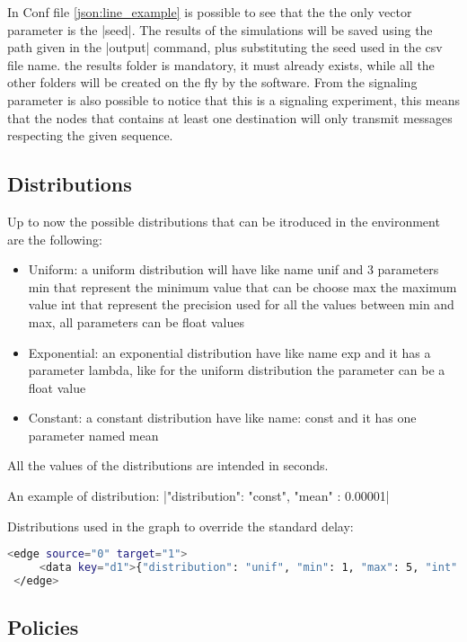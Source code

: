 \documentclass[10pt,journal,onecolumn]{IEEEtran}
\begin{document}
In Conf file \ref{json:line_example} is possible to see that the the only vector
parameter is the |seed|.
The results of the simulations will be saved using the path given in the |output|
command, plus substituting the seed used in the csv file name.
the results folder is mandatory, it must already exists, while all the other 
folders will be created on the fly by the software.
From the signaling parameter is also possible to notice that this is a signaling
experiment, this means that the nodes that contains at least one destination will
only transmit messages respecting the given sequence.

\subsection{Distributions}
\label{subsec:distribution}

Up to now the possible distributions that can be itroduced in the environment are the following:

\begin{itemize}
    \item Uniform: a uniform distribution will have like name unif and 3 parameters 
		min that represent the minimum value that can be choose max the maximum 
		value int that represent the precision used for all the values between 
		min and max, all parameters can be float values
    \item Exponential: an exponential distribution have like name exp and it has 
		a parameter lambda, like for the uniform distribution the parameter can 
		be a float value
    \item Constant: a constant distribution have like name: const and it has one 
		parameter named mean
\end{itemize}

All the values of the distributions are intended in seconds.

An example of distribution: |{"distribution": "const", "mean" : 0.00001}|

Distributions used in the graph to override the standard delay:
\begin{lstlisting}[language=bash]
 <edge source="0" target="1">
     <data key="d1">{"distribution": "unif", "min": 1, "max": 5, "int": 0.01}</data>
 </edge>
\end{lstlisting}

\subsection{Policies}
\label{subsec:policies}
\end{document}
